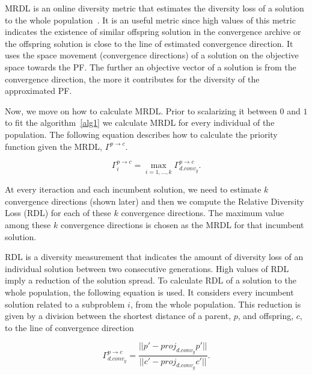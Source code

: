  MRDL is an online diversity metric that estimates the diversity loss of a solution to the whole population~\cite{gee2015online}. It is an useful metric since high values of this metric indicates the existence of similar offspring solution in the convergence archive or the offspring solution is close to the line of estimated convergence direction. It uses the space movement (convergence directions) of a solution on the objective space towards the PF. The further an objective vector of a solution is from the convergence direction, the more it contributes for the diversity of the approximated PF. 

Now, we move on how to calculate MRDL. Prior to scalarizing it between $0$ and $1$ to fit the algorithm~\ref{alg1} we calculate MRDL for every individual of the population. The following equation describes how to calculate the priority function given the MRDL, $\Gamma^{p \rightarrow c}$.


\vspace{-1em}
\begin{equation}
\Gamma_{i}^{p \rightarrow c} = \underset{i=1,...,k}{\max} \Gamma_{d.conv_{y}}^{p \rightarrow c}.
\end{equation}



At every iteraction and each incumbent solution, we need to estimate $k$ convergence directions (shown later)  and then we compute the Relative Diversity Loss (RDL) for each of these $k$ convergence directions. The maximum value among  these $k$ convergence directions is chosen as the MRDL for that incumbent solution.

 RDL is a diversity measurement  that indicates the amount of diversity loss of an individual solution between two consecutive generations. High values of RDL imply a reduction of the solution spread.  To calculate RDL of a solution to the whole population, the following equation is used. It considers every incumbent solution related to a subproblem $i$, from the whole population. This reduction is given by a division between the shortest distance of a parent, $p$,  and offspring, $c$, to the line of convergence direction

\begin{equation}
\label{rdl}
\Gamma_{d.conv_{y}}^{p \rightarrow c} = \dfrac{ ||p \prime - proj_{d.conv_{y}}p \prime|| }{||c \prime - proj_{d.conv_{y}}c \prime||}.
\end{equation}


